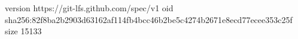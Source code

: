 version https://git-lfs.github.com/spec/v1
oid sha256:82f8ba2b2903d63162af114fb4bcc46b2be5c4274b2671e8ecd77ecee353c25f
size 15133
